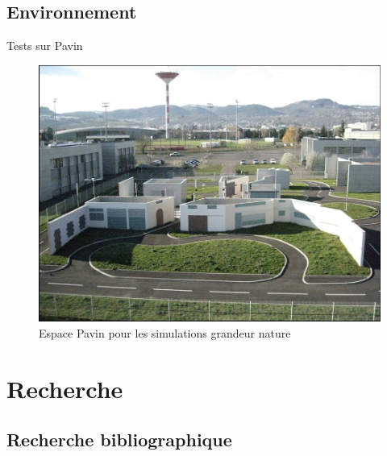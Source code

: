 \documentclass{beamer}
\begin{document}
\subsection*{Environnement}
\begin{frame}{Tests sur Pavin}

  \begin{figure}
    \includegraphics[width=0.7\linewidth]{images/pavin.jpg}
    \caption{Espace Pavin pour les simulations grandeur nature}
  \end{figure}
\end{frame}


\section{Recherche}
\subsection*{Recherche bibliographique}
\end{document}
